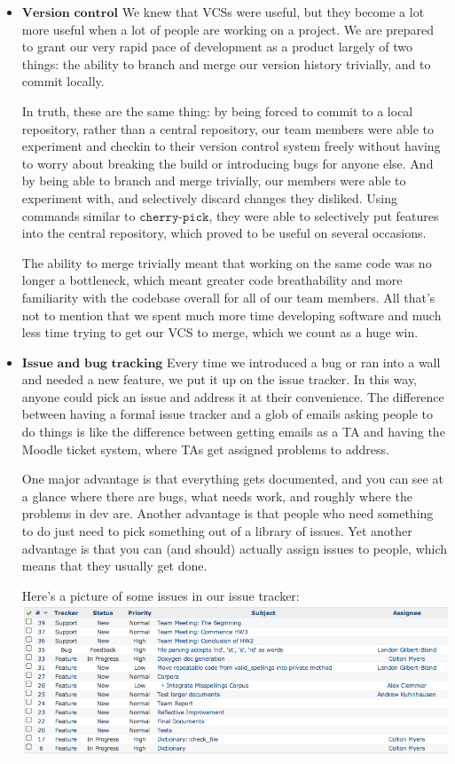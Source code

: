 \documentclass[a4paper]{article}
\begin{document}
\begin{itemize}
	\item $\textbf{Version control}$ We knew that VCSs were useful, but they become a lot more useful when a lot of people are working on a project. We are prepared to grant our very rapid pace of development as a product largely of two things: the ability to branch and merge our version history trivially, and to commit locally.
	
	In truth, these are the same thing: by being forced to commit to a local repository, rather than a central repository, our team members were able to experiment and checkin to their version control system freely without having to worry about breaking the build or introducing bugs for anyone else. And by being able to branch and merge trivially, our members were able to experiment with, and selectively discard changes they disliked. Using commands similar to $\texttt{cherry-pick}$, they were able to selectively put features into the central repository, which proved to be useful on several occasions.
	
	The ability to merge trivially meant that working on the same code was no longer a bottleneck, which meant greater code breathability and more familiarity with the codebase overall for all of our team members. All that's not to mention that we spent much more time developing software and much less time trying to get our VCS to merge, which we count as a huge win.
	
	\item $\textbf{Issue and bug tracking}$ Every time we introduced a bug or ran into a wall and needed a new feature, we put it up on the issue tracker. In this way, anyone could pick an issue and address it at their convenience. The difference between having a formal issue tracker and a glob of emails asking people to do things is like the difference between getting emails as a TA and having the Moodle ticket system, where TAs get assigned problems to address.
	
	One major advantage is that everything gets documented, and you can see at a glance where there are bugs, what needs work, and roughly where the problems in dev are. Another advantage is that people who need something to do just need to pick something out of a library of issues. Yet another advantage is that you can (and should) actually assign issues to people, which means that they usually get done.
	
	Here's a picture of some issues in our issue tracker:\\
	\includegraphics[scale=0.4]{issues.png}
	

\end{itemize}
\end{document}
